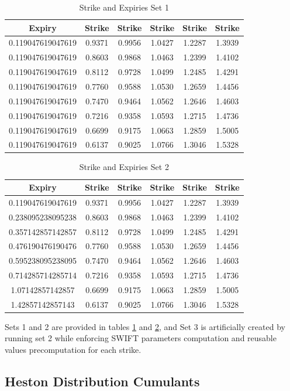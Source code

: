 \documentclass[12,twoside]{mammeTFM}
\theoremstyle{definition}
\theoremstyle{remark}
\begin{document}
\begin{table}[!h]
\begin{center}
 \begin{tabular}{|c | c | c | c | c | c |} 
 \hline
 Expiry & Strike & Strike & Strike & Strike & Strike \\ [0.5ex] 
 \hline
 0.119047619047619 & 0.9371 & 0.9956 & 1.0427 & 1.2287 & 1.3939 \\
\hline
0.119047619047619 & 0.8603 & 0.9868 & 1.0463 & 1.2399 & 1.4102 \\
\hline
0.119047619047619 & 0.8112 & 0.9728 & 1.0499 & 1.2485 & 1.4291 \\
\hline
0.119047619047619 & 0.7760 & 0.9588 & 1.0530 & 1.2659 & 1.4456 \\
\hline
0.119047619047619 & 0.7470 & 0.9464 & 1.0562 & 1.2646 & 1.4603 \\
\hline
0.119047619047619 & 0.7216 & 0.9358 & 1.0593 & 1.2715 & 1.4736 \\
\hline
0.119047619047619 & 0.6699 & 0.9175 & 1.0663 & 1.2859 & 1.5005 \\
\hline
0.119047619047619 & 0.6137 & 0.9025 & 1.0766 & 1.3046 & 1.5328 \\
 \hline
\end{tabular}
\caption{Strike and Expiries Set 1}\label{table:set1}
\end{center}
\end{table}

\begin{table}[!h]
\begin{center}
 \begin{tabular}{|c | c | c | c | c | c |} 
 \hline
 Expiry & Strike & Strike & Strike & Strike & Strike \\ [0.5ex] 
 \hline
 0.119047619047619 & 0.9371 & 0.9956 & 1.0427 & 1.2287 & 1.3939 \\
\hline
0.238095238095238 & 0.8603 & 0.9868 & 1.0463 & 1.2399 & 1.4102 \\
\hline
0.357142857142857 & 0.8112 & 0.9728 & 1.0499 & 1.2485 & 1.4291 \\
\hline
0.476190476190476 & 0.7760 & 0.9588 & 1.0530 & 1.2659 & 1.4456 \\
\hline
0.595238095238095 & 0.7470 & 0.9464 & 1.0562 & 1.2646 & 1.4603 \\
\hline
0.714285714285714 & 0.7216 & 0.9358 & 1.0593 & 1.2715 & 1.4736 \\
\hline
1.07142857142857 & 0.6699 & 0.9175 & 1.0663 & 1.2859 & 1.5005 \\
\hline
1.42857142857143 & 0.6137 & 0.9025 & 1.0766 & 1.3046 & 1.5328 \\
 \hline
\end{tabular}
\caption{Strike and Expiries Set 2}\label{table:set2}
\end{center}
\end{table}

Sets 1 and 2 are provided in tables \ref{table:set1} and \ref{table:set2}, and Set 3 is artificially created by running set 2 while enforcing SWIFT parameters computation and reusable values precomputation for each strike.

\subsection{Heston Distribution Cumulants}\label{app:cumulants}
\end{document}
